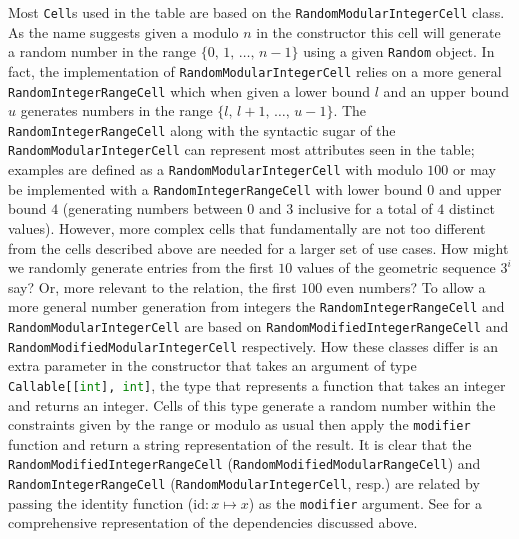 Most \lstinline{Cell}s used in the  table are based on the
\lstinline{RandomModularIntegerCell} class. As the name suggests given a modulo
$n$ in the constructor this cell will generate a random number in the range $\{0,
\,1,\,\ldots,\,n - 1\}$ using a given \lstinline{Random} object. In fact, the
implementation of \lstinline{RandomModularIntegerCell} relies on a more general
\lstinline{RandomIntegerRangeCell} which when given a lower bound $l$ and an
upper bound $u$ generates numbers in the range $\{l,\,l + 1,\,\ldots,\,u - 1\}$.
The \lstinline{RandomIntegerRangeCell} along with the syntactic sugar of the
\lstinline{RandomModularIntegerCell} can represent most attributes seen in the
 table; examples are  defined as a
\lstinline{RandomModularIntegerCell} with modulo $100$ or
 may be implemented with a
\lstinline{RandomIntegerRangeCell} with lower bound $0$ and upper bound $4$
(generating numbers between $0$ and $3$ inclusive for a total of $4$ distinct
values). However, more complex cells that fundamentally are not too different
from the cells described above are needed for a larger set of use cases. How
might we randomly generate entries from the first $10$ values of the geometric
sequence $3^i$ say? Or, more relevant to the  relation, the
first $100$ even numbers? To allow a more general number generation from
integers the \lstinline{RandomIntegerRangeCell} and
\lstinline{RandomModularIntegerCell} are based on
\lstinline{RandomModifiedIntegerRangeCell} and
\lstinline{RandomModifiedModularIntegerCell} respectively. How these classes
differ is an extra parameter in the constructor that takes an argument of type
\lstinline[language=Python]{Callable[[int], int]}, the type that represents a function that takes an integer
and returns an integer. Cells of this type generate a random number within the
constraints given by the range or modulo as usual then apply the
\lstinline{modifier} function and return a string representation of the result.
It is clear that the \lstinline{RandomModifiedIntegerRangeCell}
(\lstinline{RandomModifiedModularRangeCell}) and
\lstinline{RandomIntegerRangeCell} (\lstinline{RandomModularIntegerCell}, resp.)
are related by passing the identity function ($\mathrm{id}: x \mapsto x$) as the
\lstinline{modifier} argument. See
 for a
comprehensive representation of the dependencies discussed above.

